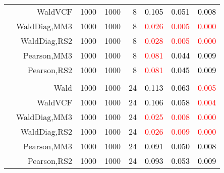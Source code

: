 \documentclass[
]{article}
\begin{document}
\begin{table}[H]
{\begin{tabular}[t]{lrrrrrrr}
\hspace{1em} & WaldVCF & 1000 & 1000 & 8 & \textcolor{black}{0.105} & \textcolor{black}{0.051} & \textcolor{black}{0.008}\\

\hspace{1em} & WaldDiag,MM3 & 1000 & 1000 & 8 & \textcolor{red}{0.026} & \textcolor{red}{0.005} & \textcolor{red}{0.000}\\

\hspace{1em} & WaldDiag,RS2 & 1000 & 1000 & 8 & \textcolor{red}{0.028} & \textcolor{red}{0.005} & \textcolor{red}{0.000}\\

\hspace{1em} & Pearson,MM3 & 1000 & 1000 & 8 & \textcolor{red}{0.081} & \textcolor{black}{0.044} & \textcolor{black}{0.009}\\

\hspace{1em} & Pearson,RS2 & 1000 & 1000 & 8 & \textcolor{red}{0.081} & \textcolor{black}{0.045} & \textcolor{black}{0.009}\\
\cmidrule{1-8}
\addlinespace[0.3em]
\multicolumn{8}{l}{\textbf{3F 15V}}\\
\hspace{1em} & Wald & 1000 & 1000 & 24 & \textcolor{black}{0.113} & \textcolor{black}{0.063} & \textcolor{red}{0.005}\\

\hspace{1em} & WaldVCF & 1000 & 1000 & 24 & \textcolor{black}{0.106} & \textcolor{black}{0.058} & \textcolor{red}{0.004}\\

\hspace{1em} & WaldDiag,MM3 & 1000 & 1000 & 24 & \textcolor{red}{0.025} & \textcolor{red}{0.008} & \textcolor{red}{0.000}\\

\hspace{1em} & WaldDiag,RS2 & 1000 & 1000 & 24 & \textcolor{red}{0.026} & \textcolor{red}{0.009} & \textcolor{red}{0.000}\\

\hspace{1em} & Pearson,MM3 & 1000 & 1000 & 24 & \textcolor{black}{0.091} & \textcolor{black}{0.050} & \textcolor{black}{0.008}\\

\hspace{1em} & Pearson,RS2 & 1000 & 1000 & 24 & \textcolor{black}{0.093} & \textcolor{black}{0.053} & \textcolor{black}{0.009}\\
\bottomrule
\end{tabular}}
\endgroup{}
\end{table}
\end{document}
